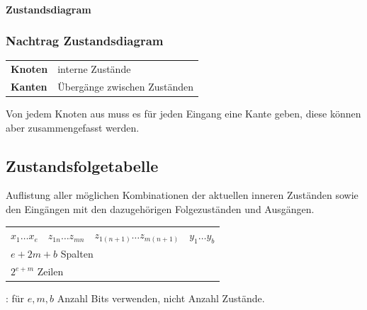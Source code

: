 \paragraph{Zustandsdiagram}
\begin{center}
\end{center}
\subsubsection{Nachtrag Zustandsdiagram}
\begin{flushleft}
    \begin{tabular}{l l}
        \textbf{Knoten} & interne Zustände\\
        \textbf{Kanten} & Übergänge zwischen Zuständen
    \end{tabular}
\end{flushleft}
 Von jedem Knoten aus muss es für jeden Eingang eine Kante geben, diese können aber zusammengefasst werden.
\subsection{Zustandsfolgetabelle}
Auflistung aller möglichen Kombinationen der aktuellen inneren Zuständen sowie den Eingängen mit den dazugehörigen Folgezuständen und Ausgängen.
\begin{flushleft}
    \small
    \renewcommand{\arraystretch}{1.5}
    \begin{tabular}{c|c|c|c}
        $x_1 \dots x_e$ & $z_{1n} \dots z_{mn}$ & $z_{1(n+1)} \dots z_{m(n+1)}$ & $y_{1} \dots y_{b}$\\
        \multicolumn{4}{l}{$e + 2m + b$ Spalten}\\
        \multicolumn{4}{l}{$2^{e + m}$ Zeilen}\\
    \end{tabular}
\end{flushleft}
: für $e,m,b$ Anzahl Bits verwenden, nicht Anzahl Zustände.
